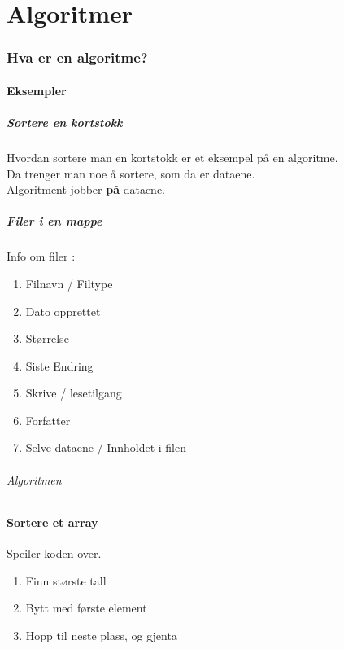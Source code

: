 \documentclass[11pt]{article}
\begin{document}
\tableofcontents
\newpage

\part{Algoritmer}
\newpage
\section{Hva er en algoritme?}
\subsection{Eksempler}
\subsubsection{Sortere en kortstokk}
Hvordan sortere man en kortstokk er et eksempel på en algoritme.\\
Da trenger man noe å sortere, som da er dataene. \\
Algoritment jobber \textbf{på} dataene. \\

\subsubsection{Filer i en mappe}
Info om filer :
\begin{enumerate}[--]
	\item Filnavn / Filtype
	\item Dato opprettet
	\item Størrelse
	\item Siste Endring
	\item Skrive / lesetilgang
	\item Forfatter
	\item Selve dataene / Innholdet i filen
\end{enumerate}
\paragraph{Algoritmen}

\subsection{Sortere et array}
Speiler koden over.
\begin{enumerate}
	\item Finn største tall
	\item Bytt med første element
	\item Hopp til neste plass, og gjenta
\end{enumerate}
\end{document}
